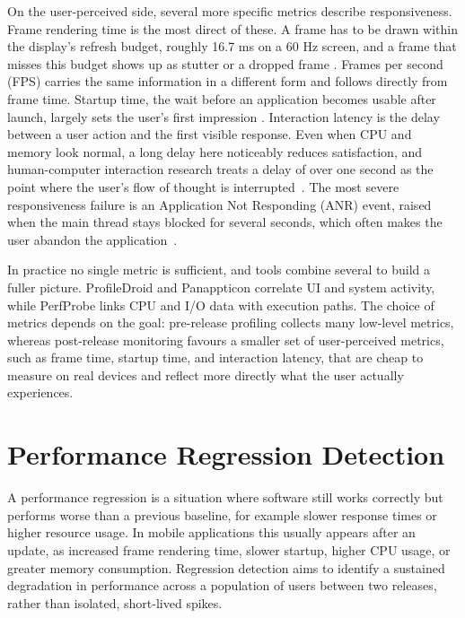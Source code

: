 On the user-perceived side, several more specific metrics describe responsiveness. Frame rendering time is the most direct of these. A frame has to be drawn within the display's refresh budget, roughly 16.7 ms on a 60 Hz screen, and a frame that misses this budget shows up as stutter or a dropped frame \cite{AndroidVitals}. Frames per second (FPS) carries the same information in a different form and follows directly from frame time. Startup time, the wait before an application becomes usable after launch, largely sets the user's first impression \cite{AndroidVitals}. %
Interaction latency is the delay between a user action and the first visible response. Even when CPU and memory look normal, a long delay here noticeably reduces satisfaction, and human-computer interaction research treats a delay of over one second as the point where the user’s flow of thought is interrupted~\cite{NielsenResponseTimes}. The most severe responsiveness failure is an Application Not Responding (ANR) event, raised when the main thread stays blocked for several seconds, which often makes the user abandon the application~\cite{AndroidVitals, AgingOrGlitching}.

In practice no single metric is sufficient, and tools combine several to build a fuller picture. ProfileDroid and Panappticon correlate UI and system activity, while PerfProbe links CPU and I/O data with execution paths. The choice of metrics depends on the goal: pre-release profiling collects many low-level metrics, whereas post-release monitoring favours a smaller set of user-perceived metrics, such as frame time, startup time, and interaction latency, that are cheap to measure on real devices and reflect more directly what the user actually experiences.

\section{Performance Regression Detection}

A performance regression is a situation where software still works correctly but performs worse than a previous baseline, for example slower response times or higher resource usage. In mobile applications this usually appears after an update, as increased frame rendering time, slower startup, higher CPU usage, or greater memory consumption. Regression detection aims to identify a sustained degradation in performance across a population of users between two releases, rather than isolated, short-lived spikes.

